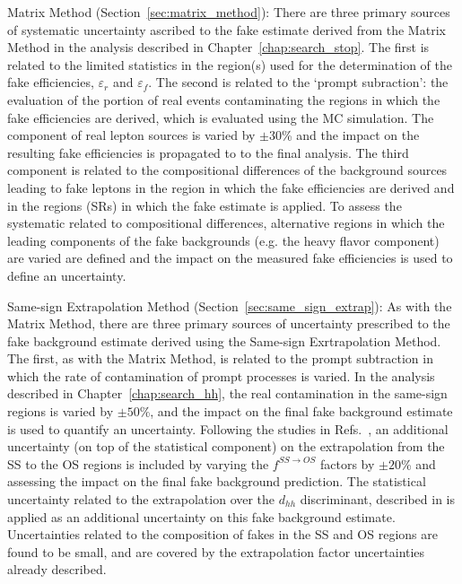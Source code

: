 \begin{description}
    \item{Matrix Method (Section~\ref{sec:matrix_method}):} There are three primary sources of systematic
        uncertainty ascribed to the fake estimate derived from the Matrix Method in the analysis described
        in Chapter~\ref{chap:search_stop}.
        The first is related to the limited statistics in the region(s) used for the determination of the
        fake efficiencies, $\varepsilon_r$ and $\varepsilon_f$.
        The second is related to the `prompt subraction': the evaluation of the portion of real events contaminating the
        regions in which the fake efficiencies are derived, which is evaluated using the MC simulation.       
        The component of real lepton sources is varied by $\pm 30$\% and the impact on the resulting
        fake efficiencies is propagated to to the final analysis. 
        The third component is related to the compositional differences of the background sources leading
        to fake leptons in the region in which the fake efficiencies are derived and in the regions (SRs)
        in which the fake estimate is applied.
        To assess the systematic related to compositional differences, alternative regions in which the leading
        components of the fake backgrounds (e.g. the heavy flavor component) are varied are defined and the impact on the measured fake efficiencies
        is used to define an uncertainty.
    \item{Same-sign Extrapolation Method (Section~\ref{sec:same_sign_extrap}):} As with the Matrix Method,
        there are three primary sources of uncertainty prescribed to the fake background estimate derived using
        the Same-sign Exrtrapolation Method. The first, as with the Matrix Method, is related to the prompt subtraction
        in which the rate of contamination of prompt processes is varied.
        In the analysis described in Chapter~\ref{chap:search_hh}, the real contamination in the same-sign
        regions is varied by $\pm 50$\%, and the impact on the final fake background estimate is used to quantify
        an uncertainty.
        Following the studies in Refs.~\cite{TOPQ-2015-09,TOPQ-2017-05}, an additional uncertainty (on top of the statistical component) on the
        extrapolation from the SS to the OS regions is included by varying the $f^{SS \rightarrow OS}$ factors
        by $\pm 20$\% and assessing the impact on the final fake background prediction.
        The statistical uncertainty related to the extrapolation over the $d_{hh}$ discriminant,
        described in {\color{red}{Section XXX}} is applied as an additional uncertainty on this fake background estimate.
        Uncertainties related to the composition of fakes in the SS and OS regions are found to be small,
        and are covered by the extrapolation factor uncertainties already described.
\end{description}



